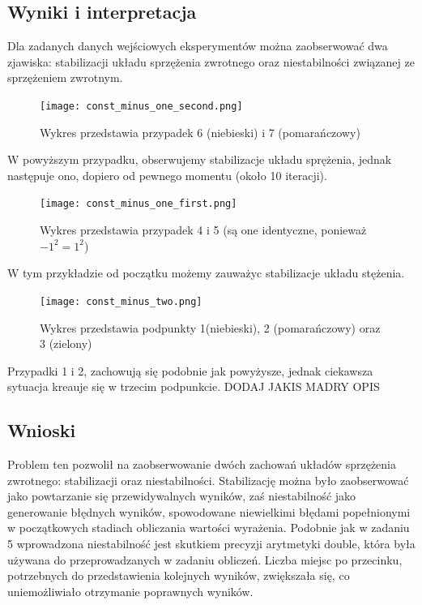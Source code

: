 \documentclass[8pt,letterpaper]{article}
\begin{document}
\subsection{Wyniki i interpretacja}

\hspace{1 cm} Dla zadanych danych wejściowych eksperymentów można zaobserwować dwa zjawiska: stabilizacji układu sprzężenia zwrotnego oraz niestabilności związanej ze sprzężeniem zwrotnym.
\begin{figure}[h!]
\texttt{[image: const\_minus\_one\_second.png]}
\caption{Wykres przedstawia przypadek 6 (niebieski) i 7 (pomarańczowy)}
\end{figure}
\hspace{1 cm} W powyższym przypadku, obserwujemy stabilizacje układu sprężenia, jednak następuje ono, dopiero od pewnego momentu (około 10 iteracji).
\begin{figure}[h!]
\texttt{[image: const\_minus\_one\_first.png]}
\caption{Wykres przedstawia przypadek 4 i 5 (są one identyczne, ponieważ $-1^{2} = 1^{2}$)}
\end{figure}

\hspace{1 cm} W tym przykładzie od początku możemy zauważyc stabilizacje układu stężenia.
\begin{figure}[h!]
\texttt{[image: const\_minus\_two.png]}
\caption{Wykres przedstawia podpunkty 1(niebieski), 2 (pomarańczowy) oraz 3 (zielony)}
\end{figure}

\hspace{1 cm} Przypadki 1 i 2, zachowują się podobnie jak powyżysze, jednak ciekawsza sytuacja kreauje się w trzecim podpunkcie. DODAJ JAKIS MADRY OPIS

\subsection{Wnioski}
\hspace{1 cm}Problem ten pozwolił na zaobserwowanie dwóch zachowań układów sprzężenia zwrotnego: stabilizacji oraz niestabilności. Stabilizację można było zaobserwować jako powtarzanie się przewidywalnych wyników, zaś niestabilność jako generowanie błędnych wyników, spowodowane niewielkimi błędami popełnionymi w początkowych stadiach obliczania wartości wyrażenia. Podobnie jak w zadaniu 5 wprowadzona niestabilność jest skutkiem precyzji arytmetyki double, która była używana do przeprowadzanych w zadaniu obliczeń. Liczba miejsc po przecinku, potrzebnych do przedstawienia kolejnych wyników, zwiększała się, co uniemożliwiało otrzymanie poprawnych wyników.
\end{document}

